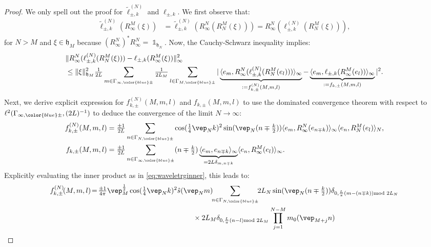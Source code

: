 \documentclass[a4paper, 11pt]{article}
\newcommand{\fh}{\mathfrak{h}}
\newcommand{\ltwo}{\ell^{2}}
\DeclareMathOperator{\1}{\mathds{1}}
\begin{document}
\begin{proof}
We only spell out the proof for $\tilde{\ell}^{(N)}_{\pm,k}$ and $\ell_{\pm,k}$. We first observe that:
\begin{align*}
\tilde{\ell}^{(N)}_{\pm,k}(R^{M}_{\infty}(\xi)) & = \tilde{\ell}^{(N)}_{\pm,k}(R^{N}_{\infty}(R^{M}_{N}(\xi))) = R^{N}_{\infty}(\ell^{(N)}_{\pm,k}(R^{M}_{N}(\xi))),
\end{align*}
for $N>M$ and $\xi\in\fh_{M}$ because $(R^{N}_{\infty})^{*}R^{N}_{\infty} = \1_{\fh_{N}}$. Now, the Cauchy-Schwarz inequality implies:
\begin{align*}
& \|R^{N}_{\infty}(\ell^{(N)}_{\pm,k}(R^{M}_{N}(\xi))) - \ell_{\pm,k}(R^{M}_{\infty}(\xi))\|_{\infty}^{2} \\ 
& \leq \|\xi\|_{\fh_{M}}^{2}\tfrac{1}{2L}\sum_{m\in\Gamma_{\infty,{\color{blue}\pm}}}\tfrac{1}{2L_{M}}\sum_{l\in\Gamma_{M,{\color{blue}\pm}}}|\underbrace{\langle e_{m},R^{N}_{\infty}(\ell^{(N)}_{\pm,k}(R^{M}_{N}(e_{l})))\rangle_{\infty}}_{:=f^{(N)}_{k,\pm}(M,m,l)}-\underbrace{\langle e_{m},\ell_{\pm,k}(R^{M}_{\infty}(e_{l}))\rangle_{\infty}}_{:=f_{k,\pm}(M,m,l)}|^{2}.
\end{align*}
Next, we derive explicit expression for $f^{(N)}_{k,\pm}(M,m,l)$ and $f_{k,\pm}(M,m,l)$ to use the dominated convergence theorem with respect to $\ltwo(\Gamma_{\infty,{\color{blue}\pm}},(2L)^{-1})$ to deduce the convergence of the limit $N\rightarrow\infty$:
\begin{align*}
f^{(N)}_{k,\pm}(M,m,l) & = \tfrac{\pm1}{2L}\sum_{n\in\Gamma_{N,{\color{blue}\pm}}}\cos(\tfrac{1}{4}\vep_{N}k)^{2}\sin(\vep_{N}(n\mp\tfrac{k}{2}))\langle e_{m},R^{N}_{\infty}(e_{n\mp k})\rangle_{\infty}\langle e_{n},R^{M}_{N}(e_{l})\rangle_{N}, \\
f_{k,\pm}(M,m,l) & = \tfrac{\pm1}{2L}\sum_{n\in\Gamma_{\infty,{\color{blue}\pm}}}(n\mp\tfrac{k}{2})\underbrace{\langle e_{m},e_{n\mp k}\rangle_{\infty}}_{=2L\delta_{m,n\mp k}}\langle e_{n},R^{M}_{\infty}(e_{l})\rangle_{\infty}.
\end{align*}
Explicitly evaluating the inner product as in \eqref{eq:waveletrginner}, this leads to:
\begin{align*}
f^{(N)}_{k,\pm}\!(M,m,l) &\!=\!\tfrac{\pm1}{4\pi}\vep_{M}^{\frac{1}{2}} \cos(\tfrac{1}{4}\vep_{N}k)^{2}\hat{s}(\vep_{N}m)\!\!\sum_{n\in\Gamma_{N,{\color{blue}\pm}}}\!\!2L_{N}\sin(\vep_{N}(n\mp\tfrac{k}{2}))\delta_{0,\frac{L}{\pi}(m-(n\mp k))\!\!\!\!\mod 2L_{N}} \\
& \hspace{5cm} \times 2L_{M}\delta_{0,\frac{L}{\pi}(n-l)\!\!\!\!\mod 2L_{M}}\prod_{j=1}^{N-M}m_{0}(\vep_{M+j}n) \\

\end{align*}
\end{proof}
\end{document}

